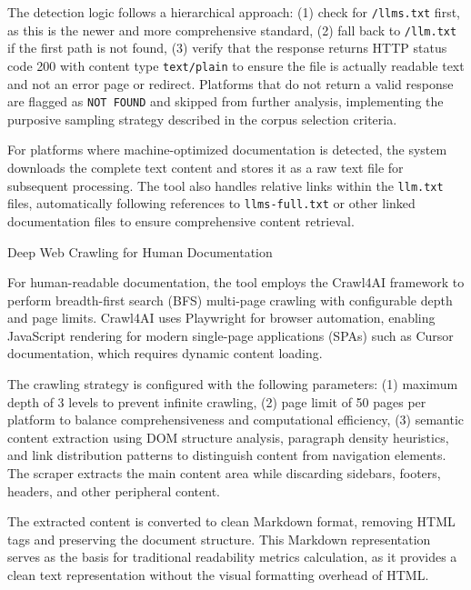 \documentclass[10pt,conference,a4paper]{IEEEtran}
\makeatletter
\let\oldsubsubsection\subsubsection
\renewcommand{\subsubsection}{%
    \@ifstar{\subsubsectionStar}{\subsubsectionNoStar}%
}
\newcommand{\subsubsectionStar}[1]{%
    \oldsubsubsection*{\textit{#1}}%
}
\newcommand{\subsubsectionNoStar}[1]{%
    \oldsubsubsection{\textit{#1}}%
}
\makeatother
\begin{document}
The detection logic follows a hierarchical approach: (1) check for \texttt{/llms.txt} first, as this is the newer and more comprehensive standard, (2) fall back to \texttt{/llm.txt} if the first path is not found, (3) verify that the response returns HTTP status code 200 with content type \texttt{text/plain} to ensure the file is actually readable text and not an error page or redirect. Platforms that do not return a valid response are flagged as \texttt{NOT FOUND} and skipped from further analysis, implementing the purposive sampling strategy described in the corpus selection criteria.

For platforms where machine-optimized documentation is detected, the system downloads the complete text content and stores it as a raw text file for subsequent processing. The tool also handles relative links within the \texttt{llm.txt} files, automatically following references to \texttt{llms-full.txt} or other linked documentation files to ensure comprehensive content retrieval.

\subsubsection{Deep Web Crawling for Human Documentation}

For human-readable documentation, the tool employs the Crawl4AI framework to perform breadth-first search (BFS) multi-page crawling with configurable depth and page limits. Crawl4AI uses Playwright for browser automation, enabling JavaScript rendering for modern single-page applications (SPAs) such as Cursor documentation, which requires dynamic content loading.

The crawling strategy is configured with the following parameters: (1) maximum depth of 3 levels to prevent infinite crawling, (2) page limit of 50 pages per platform to balance comprehensiveness and computational efficiency, (3) semantic content extraction using DOM structure analysis, paragraph density heuristics, and link distribution patterns to distinguish content from navigation elements. The scraper extracts the main content area while discarding sidebars, footers, headers, and other peripheral content.

The extracted content is converted to clean Markdown format, removing HTML tags and preserving the document structure. This Markdown representation serves as the basis for traditional readability metrics calculation, as it provides a clean text representation without the visual formatting overhead of HTML.
\end{document}
